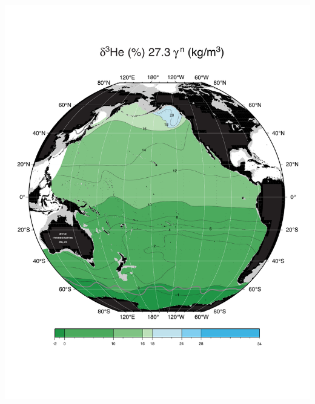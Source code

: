 \documentclass{beamer}
\begin{document}
\begin{frame}[plain,t]
\begin{columns}
\begin{column}{0.33\textwidth}
        \includegraphics[width=\textwidth]{delhe3_isopyc_final_pdf/pac2730_delhe3_final.pdf}
      \end{column}
    \end{columns} 
\end{frame}
\end{document}
